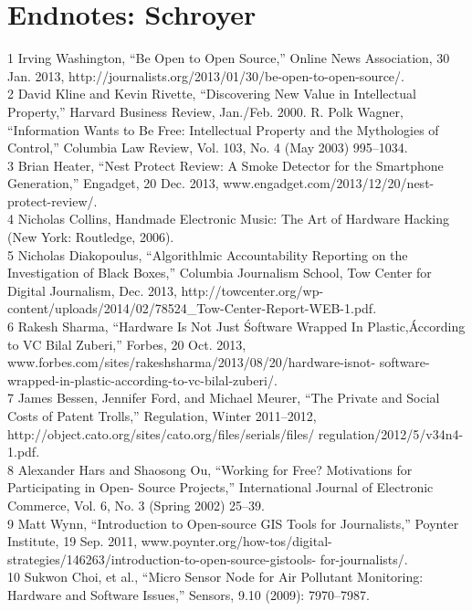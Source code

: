 \section{Endnotes: Schroyer}
1 Irving Washington, ``Be Open to Open Source,'' Online News Association, 30 Jan. 2013,
http://journalists.org/2013/01/30/be-open-to-open-source/.\\
2 David Kline and Kevin Rivette, ``Discovering New Value in Intellectual Property,''
Harvard Business Review, Jan./Feb. 2000. R. Polk Wagner, ``Information Wants to Be Free:
Intellectual Property and the Mythologies of Control,'' Columbia Law Review, Vol. 103,
No. 4 (May 2003) 995–1034.\\
3 Brian Heater, ``Nest Protect Review: A Smoke Detector for the Smartphone Generation,''
Engadget, 20 Dec. 2013, www.engadget.com/2013/12/20/nest-protect-review/.\\
4 Nicholas Collins, Handmade Electronic Music: The Art of Hardware Hacking (New York:
Routledge, 2006).\\
5 Nicholas Diakopoulus, ``Algorithlmic Accountability Reporting on the Investigation of Black
Boxes,'' Columbia Journalism School, Tow Center for Digital Journalism, Dec. 2013,
http://towcenter.org/wp-content/uploads/2014/02/78524_Tow-Center-Report-WEB-1.pdf.\\
6 Rakesh Sharma, ``Hardware Is Not Just \'Software Wrapped In Plastic,\' According to VC Bilal
Zuberi,'' Forbes, 20 Oct. 2013, www.forbes.com/sites/rakeshsharma/2013/08/20/hardware-isnot-
software-wrapped-in-plastic-according-to-vc-bilal-zuberi/.\\
7 James Bessen, Jennifer Ford, and Michael Meurer, ``The Private and Social Costs of Patent
Trolls,'' Regulation, Winter 2011–2012, http://object.cato.org/sites/cato.org/files/serials/files/
regulation/2012/5/v34n4-1.pdf.\\
8 Alexander Hars and Shaosong Ou, ``Working for Free? Motivations for Participating in Open-
Source Projects,'' International Journal of Electronic Commerce, Vol. 6, No. 3 (Spring 2002) 25–39.\\
9 Matt Wynn, ``Introduction to Open-source GIS Tools for Journalists,'' Poynter Institute, 19 Sep.
2011, www.poynter.org/how-tos/digital-strategies/146263/introduction-to-open-source-gistools-
for-journalists/.\\
10 Sukwon Choi, et al., ``Micro Sensor Node for Air Pollutant Monitoring: Hardware and Software
Issues,'' Sensors, 9.10 (2009): 7970–7987.\\
